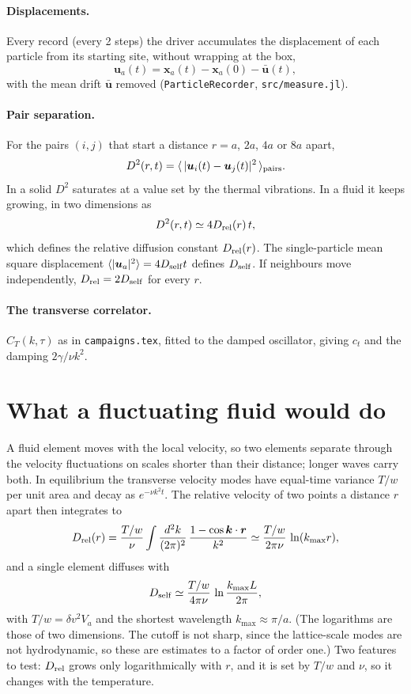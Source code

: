 \documentclass[11pt,aps,preprint,nofootinbib,superscriptaddress,tightenlines]{revtex4-2}
\def\st{\begin{equation}}
\def\stp{\end{equation}}
\newcommand{\avg}[1]{\langle #1\rangle}
\let\oldparagraph\paragraph
\renewcommand{\paragraph}{\par\bigskip\oldparagraph}
\begin{document}
\paragraph{Displacements.}  Every record (every 2 steps) the driver accumulates the
displacement of each particle from its starting site, without wrapping at the box,
\st
\bm u_a(t)=\bm x_a(t)-\bm x_a(0)-\bar{\bm u}(t),
\stp
with the mean drift $\bar{\bm u}$ removed (\texttt{ParticleRecorder}, \texttt{src/measure.jl}).

\paragraph{Pair separation.}  For the pairs $(i,j)$ that start a distance $r=a$, $2a$, $4a$
or $8a$ apart,
\st
D^2(r,t)=\avg{\,|\bm u_i(t)-\bm u_j(t)|^2\,}_{\rm pairs}.
\label{D2}
\stp
In a solid $D^2$ saturates at a value set by the thermal vibrations.  In a fluid it keeps
growing, in two dimensions as
\st
D^2(r,t)\simeq4D_{\rm rel}(r)\,t ,
\label{D2fluid}
\stp
which defines the relative diffusion constant $D_{\rm rel}(r)$.  The single-particle mean
square displacement $\avg{|\bm u_a|^2}=4D_{\rm self}t$ defines $D_{\rm self}$.  If neighbours
move independently, $D_{\rm rel}=2D_{\rm self}$ for every $r$.

\paragraph{The transverse correlator.}  $C_T(k,\tau)$ as in \texttt{campaigns.tex}, fitted to
the damped oscillator, giving $c_t$ and the damping $2\gamma/\nu k^2$.

\section{What a fluctuating fluid would do}
\label{sec:hydro}

A fluid element moves with the local velocity, so two elements separate through the
velocity fluctuations on scales shorter than their distance; longer waves carry both.  In
equilibrium the transverse velocity modes have equal-time variance $T/w$ per unit area
and decay as $e^{-\nu k^2t}$.  The relative velocity of two points a distance $r$ apart
then integrates to
\st
D_{\rm rel}(r)=\frac{T/w}{\nu}\int\frac{d^2k}{(2\pi)^2}\,\frac{1-\cos\bm k\cdot\bm r}{k^2}
\simeq\frac{T/w}{2\pi\nu}\,\ln(k_{\max}r),
\label{Drel}
\stp
and a single element diffuses with
\st
D_{\rm self}\simeq\frac{T/w}{4\pi\nu}\,\ln\frac{k_{\max}L}{2\pi},
\label{Dself}
\stp
with $T/w=\delta v^2V_a$ and the shortest wavelength $k_{\max}\approx\pi/a$.  (The
logarithms are those of two dimensions.  The cutoff is not sharp, since the lattice-scale
modes are not hydrodynamic, so these are estimates to a factor of order one.)  Two
features to test: $D_{\rm rel}$ grows only logarithmically with $r$, and it is set by $T/w$
and $\nu$, so it changes with the temperature.
\end{document}
